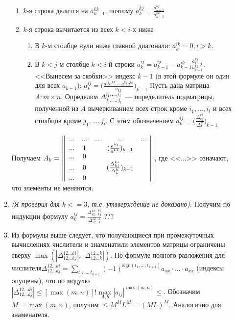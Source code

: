 \documentclass[a4paper]{article}
\newcommand{\matrixl}{\left|\left|}
\newcommand{\matrixr}{\right|\right|}
\begin{document}
\begin{enumerate}
\begin{enumerate}
\begin{enumerate}
\item $k$-я строка делится на $a_{k-1}^{kk}$, поэтому $a_k^{kj}=\frac{a_{k-1}^{kj}}{a_{k-1}^{kk}}$
\item $k$-я строка вычитается из всех $k<i$-х ниже\begin{enumerate}
\item В $k$-м столбце нули ниже главной диагонали: $a_k^{ik}=0, i>k$.
\item В $k<j$-м столбце $k<i$-й строки $a_k^{ij}=a_{k-1}^{ij}-a_{k-1}^{ik}\frac{a_{k-1}^{kj}}{a_{k-1}^{kk}}$.\newline
<<Вынесем за скобки>> индекс $k-1$ (в этой формуле он один для всех $a_{k-1}$): $a_k^{ij}=\big(\frac{a^{ij}a^{kk}-a^{kj}a^{ik}}{a_{kk}}\big)_{k-1}$\newline
Пусть дана матрица $A:m\times n$. Определим $\Delta^{i_1,...,i_t}_{j_1,...,j_t}$~--- определитель подматрицы, полученной из $A$ вычеркиванием всех строк кроме $i_1,...,i_t$ и всех столбцов кроме $j_1,...,j_t$.\newline
С этим обозначением $a_k^{ij}=\big(\frac{\Delta^{ki}_{kj}}{\Delta^k_k}\big)_{k-1}$ \label{matrixrec}
\end{enumerate}
\end{enumerate}
Получаем $A_k=\matrixl
\begin{array}{ccccc}
... & ... & ... & ... & ...\\
... & 1 & \multicolumn{3}{c}{(\frac{a^{kj}}{a^{kk}})_{k-1}}\\
... & 0 & &   &\\
... & 0 & & (\frac{\Delta^{ki}_{kj}}{\Delta^k_k})_{k-1} &\\
... & 0 & &   &\\
\end{array}
\matrixr$, где <<$...$>> означают, что элементы не меняются.
\item {\em (Я проверил для $k<=3$, т.е. утвверждение не доказано)}. Получим по индукции формулу $a_k^{ij}=\frac{\Delta^{12...ki}_{12...kj}}{\Delta^{12...k}_{12...k}}$ ??? %
\item Из формулы выше следует, что получающиеся при промежуточных вычислениях числители и знаменатили элементов матрицы ограничены сверху $\max(|\Delta^{12...ki}_{12...kj}|,\,|\Delta^{12...k}_{12...k}|)$. По формуле полного разложения для числителя\newline $\Delta^{12...ki}_{12...kj}=\sum\limits_{t_1,...,t_{k+1}}(-1)^{\mbox{sign}(t_1,...,t_{k+1})}a_{xx}\cdot...\cdot a_{xx}$ (индексы опущены), что по модулю\newline $|\Delta^{12...ki}_{12...kj}|\leqslant [\max({m,n})]!\max\limits_{A,b}|a_{ij}|^{\max(m,n)}\boxed{\leqslant}$. Обозначим $M=\max(m,n)$, получим $\boxed{\leqslant}M^ML^M=(ML)^M$. Аналогично для знаменателя.\newline

\end{enumerate}
\end{enumerate}
\end{document}
